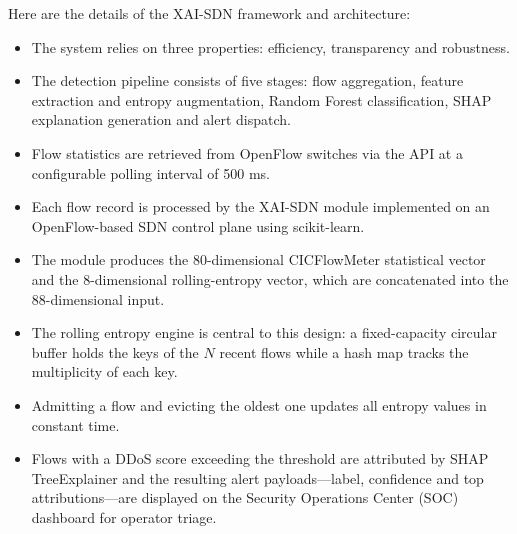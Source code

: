 \documentclass{ieeeaccess}
\begin{document}
Here are the details of the XAI-SDN framework and architecture:
\begin{itemize}
\item The system relies on three properties: efficiency, transparency and robustness.
\item The detection pipeline consists of five stages: flow aggregation, feature extraction and entropy augmentation, Random Forest classification, SHAP explanation generation and alert dispatch.
\item Flow statistics are retrieved from OpenFlow switches via the API at a configurable polling interval of 500 ms.
\item Each flow record is processed by the XAI-SDN module implemented on an OpenFlow-based SDN control plane using scikit-learn.
\item The module produces the 80-dimensional CICFlowMeter statistical vector and the 8-dimensional rolling-entropy vector, which are concatenated into the 88-dimensional input.
\item The rolling entropy engine is central to this design: a fixed-capacity circular buffer holds the keys of the $N$ recent flows while a hash map tracks the multiplicity of each key.
\item Admitting a flow and evicting the oldest one updates all entropy values in constant time.
\item Flows with a DDoS score exceeding the threshold are attributed by SHAP TreeExplainer and the resulting alert payloads---label, confidence and top attributions---are displayed on the Security Operations Center (SOC) dashboard for operator triage.
\end{itemize}
\end{document}
